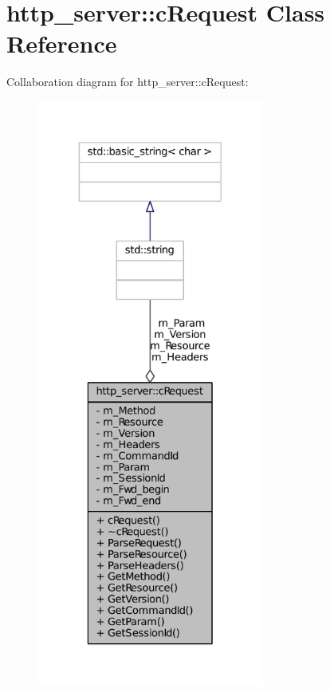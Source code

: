 \hypertarget{classhttp__server_1_1cRequest}{
\section{http\-\_\-server\-:\-:c\-Request \-Class \-Reference}
\label{classhttp__server_1_1cRequest}
}


\-Collaboration diagram for http\-\_\-server\-:\-:c\-Request\-:
\nopagebreak
\begin{figure}[H]
\begin{center}
\leavevmode
\includegraphics[height=550pt]{classhttp__server_1_1cRequest__coll__graph}
\end{center}
\end{figure}
